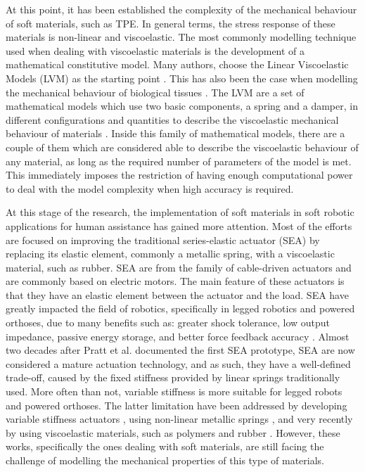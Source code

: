 At this point, it has been established the complexity of the mechanical behaviour of soft materials, such as TPE. In general terms, the stress response of these materials is non-linear and viscoelastic. The most commonly modelling technique used when dealing with viscoelastic materials is the development of a mathematical constitutive model. Many authors, choose the Linear Viscoelastic Models (LVM) as the starting point \cite{xu2014mathematical,tirella2014strain,lu2017constitutive,ciniello2017identifying}. This has also been the case when modelling the mechanical behaviour of biological tissues \cite{sanjeevi1982viscoelastic}. The LVM are a set of mathematical models which use two basic components, a spring and a damper, in different configurations and quantities to describe the viscoelastic mechanical behaviour of materials \cite{roylance2001engineering}. Inside this family of mathematical models, there are a couple of them which are considered able to describe the viscoelastic behaviour of any material, as long as the required number of parameters of the model is met. This immediately imposes the restriction of having enough computational power to deal with the model complexity when high accuracy is required.

At this stage of the research, the implementation of soft materials in soft robotic applications for human assistance has gained more attention. Most of the efforts are focused on improving the traditional series-elastic actuator (SEA) by replacing its elastic element, commonly a metallic spring, with a viscoelastic material, such as rubber. SEA are from the family of cable-driven actuators and are commonly based on electric motors. The main feature of these actuators is that they have an elastic element between the actuator and the load. SEA have greatly impacted the field of robotics, specifically in legged robotics and powered orthoses, due to many benefits such as: greater shock tolerance, low output impedance, passive energy storage, and better force feedback accuracy \cite{pratt1995series,pratt2004series,au2008powered}. Almost two decades after Pratt et al. documented the first SEA prototype, SEA are now considered a mature actuation technology, and as such, they have a well-defined trade-off, caused by the fixed stiffness provided by linear springs traditionally used. More often than not, variable stiffness is more suitable for legged robots and powered orthoses. The latter limitation have been addressed by developing variable stiffness actuators \cite{groothuis2012vsaut}, using non-linear metallic springs \cite{migliore2007novel}, and very recently by using viscoelastic materials, such as polymers and rubber \cite{rollinson2013design,parietti2011series,schepelmann2014compact}. However, these works, specifically the ones dealing with soft materials, are still facing the challenge of modelling the mechanical properties of this type of materials. 

